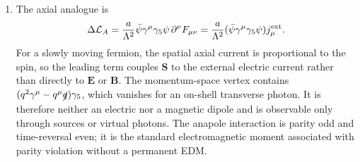 \begin{enumerate}
\begin{enumerate}
term vanishes, leaving a contribution proportional to \(q^2\).  It
therefore changes the slope of the electric form factor at \(q^2=0\), often
interpreted as a charge-radius term, while vanishing for an on-shell real
photon.
\item
The axial analogue is
\[
 \Delta\mathcal L_A
 =\frac{a}{\Lambda^2}
 \bar\psi\gamma^\mu\gamma_5\psi\,
 \partial^\nu F_{\mu\nu}
 =\frac{a}{\Lambda^2}
 (\bar\psi\gamma^\mu\gamma_5\psi)j^{\rm ext}_\mu .
\]
For a slowly moving fermion, the spatial axial current is proportional to
the spin, so the leading term couples \(\mathbf S\) to the external
electric current rather than directly to \(\mathbf E\) or \(\mathbf B\).
The momentum-space vertex contains
\((q^2\gamma^\mu-q^\mu\slashed q)\gamma_5\), which vanishes for an
on-shell transverse photon.  It is therefore neither an electric nor a
magnetic dipole and is observable only through sources or virtual photons.
The anapole interaction is parity odd and time-reversal even; it is the
standard electromagnetic moment associated with parity violation without
a permanent EDM.
\end{enumerate}
\end{enumerate}
